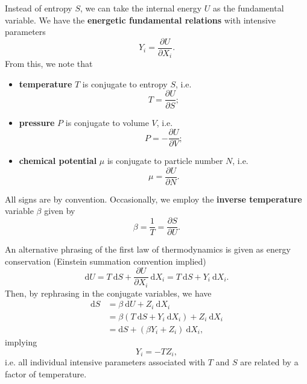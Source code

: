 \documentclass[letter-paper]{tufte-book}
\newenvironment{example}[1][Example]{\begin{trivlist}
\item[\hskip \labelsep {\bfseries #1}]}{\end{trivlist}}
\newcommand\Def[1]{\textbf{#1}}
\begin{document}
Instead of entropy $S$, we can take the internal energy $U$ as the fundamental
variable. We have the \Def{energetic fundamental
relations} with intensive parameters
\begin{equation}
  Y_i = \frac{\partial U}{\partial X_i}.
\end{equation}
From this, we note that
\begin{itemize}
  \item \Def{temperature} $T$ is conjugate to entropy $S$, i.e.
  \begin{equation}
    T = \frac{\partial U}{\partial S};
  \end{equation}
  \item \Def{pressure} $P$ is conjugate to volume $V$, i.e.
  \begin{equation}
    P = -\frac{\partial U}{\partial V};
  \end{equation}
  \item \Def{chemical potential} $\mu$ is conjugate to particle number $N$, i.e.
  \begin{equation}
    \mu = \frac{\partial U}{\partial N}.
  \end{equation}
\end{itemize}
All signs are by convention. Occasionally, we employ the \Def{inverse
temperature} variable $\beta$ given by
\begin{equation}
  \beta = \frac{1}{T} = \frac{\partial S}{\partial U}.
\end{equation}

\begin{example}
An alternative phrasing of the first law of thermodynamics is given as energy conservation
(Einstein summation convention implied)
\begin{equation}
  \mathrm{d}U = T\ \mathrm{d}S + \frac{\partial U}{\partial X_i}\ \mathrm{d}X_i = T\ \mathrm{d}S + Y_i\ \mathrm{d}X_i.
\end{equation}
Then, by rephrasing in the conjugate variables, we have
\begin{align*}
  \mathrm{d}S &= \beta\ \mathrm{d}U + Z_i\ \mathrm{d}X_i \\
    &= \beta(T\ \mathrm{d}S + Y_i\ \mathrm{d}X_i) + Z_i\ \mathrm{d}X_i \\
    &= \mathrm{d}S + (\beta Y_i + Z_i)\ \mathrm{d}X_i,
\end{align*}
implying
\begin{equation}
  Y_i = -T Z_i,
\end{equation}
i.e. all individual intensive parameters associated with $T$ and $S$ are related
by a factor of temperature.
\end{example}
\end{document}

